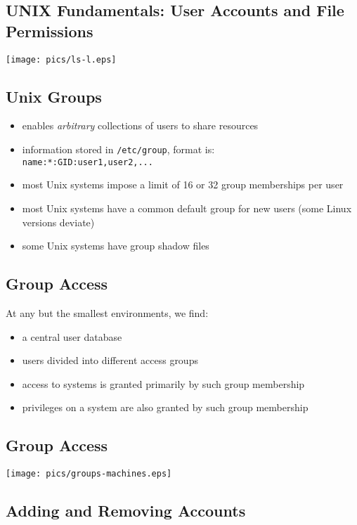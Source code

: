\documentclass[xga]{xdvislides}
\begin{document}
\subsection{UNIX Fundamentals: User Accounts and File Permissions}
\vfill
\begin{center}
	\texttt{[image: pics/ls-l.eps]}
\end{center}
\vfill

\subsection{Unix Groups}
\begin{itemize}
	\item enables {\em arbitrary} collections of users to share resources
	\item information stored in \verb+/etc/group+, format is: \\
		\verb+name:*:GID:user1,user2,...+
	\item most Unix systems impose a limit of 16 or 32 group memberships per
		user
	\item most Unix systems have a common default group for new users (some
		Linux versions deviate)
	\item some Unix systems have group shadow files
\end{itemize}

\subsection{Group Access}
At any but the smallest environments, we find:
\begin{itemize}
	\item a central user database
	\item users divided into different access groups
	\item access to systems is granted primarily by such group membership
	\item privileges on a system are also granted by such group membership
\end{itemize}

\subsection{Group Access}
\begin{center}
	\texttt{[image: pics/groups-machines.eps]}
\end{center}

\subsection{Adding and Removing Accounts}
\end{document}
